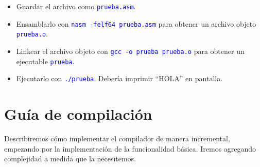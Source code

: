\documentclass{article}
\newcommand{\cmd}[1]{\textcolor{blue}{\texttt{#1}}}
\begin{document}
\begin{itemize}
\item Guardar el archivo como \cmd{prueba.asm}.
\item Ensamblarlo con \cmd{nasm -felf64 prueba.asm}
      para obtener un archivo objeto \cmd{prueba.o}.
\item Linkear el archivo objeto con \cmd{gcc -o prueba prueba.o} para obtener un ejecutable \cmd{prueba}.
\item Ejecutarlo con \cmd{./prueba}. Deber\'ia imprimir ``HOLA'' en pantalla.
\end{itemize}

\section{Gu\'ia de compilaci\'on}

Describiremos c\'omo implementar el compilador de
manera incremental, empezando por la implementaci\'on
de la funcionalidad b\'asica. Iremos agregando
complejidad a medida que la necesitemos.
\end{document}

